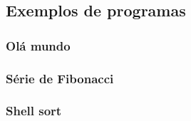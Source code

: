 \subsection{Exemplos de programas}
        \subsubsection{Olá mundo}
        
        \subsubsection{Série de Fibonacci}
        
        \subsubsection{Shell sort}
        